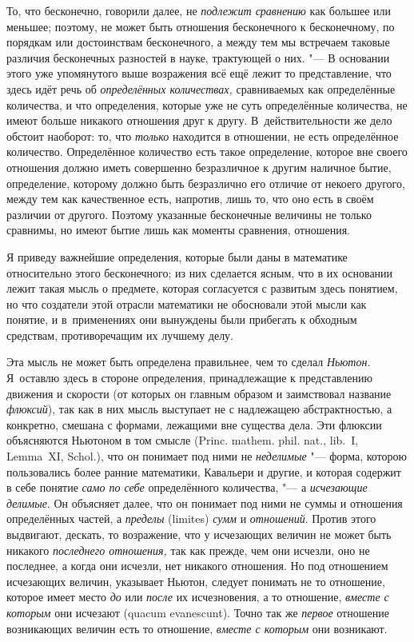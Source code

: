 То, что бесконечно, говорили далее, не {\em подлежит сравнению} как большее или
меньшее; поэтому, не может быть отношения бесконечного к бесконечному, по
порядкам или достоинствам бесконечного, а между тем мы встречаем таковые
различия бесконечных разностей в науке, трактующей о них. "--- В основании
этого уже упомянутого выше возражения всё ещё лежит то представление, что здесь
идёт речь об {\em определённых количествах,} сравниваемых как определённые
количества, и что определения, которые уже не суть определённые количества, не
имеют больше никакого отношения друг к другу. В~действительности же дело
обстоит наоборот: то, что {\em только} находится в отношении, не есть
определённое количество. Определённое количество есть такое определение,
которое вне своего отношения должно иметь совершенно безразличное к другим
наличное бытие, определение, которому должно быть безразлично его отличие от
некоего другого, между тем как качественное есть, напротив, лишь то, что оно
есть в своём различии от другого. Поэтому указанные бесконечные величины не
только сравнимы, но имеют бытие лишь как моменты сравнения, отношения.

Я приведу важнейшие определения, которые были даны в математике относительно
этого бесконечного; из них сделается ясным, что в их основании лежит такая
мысль о предмете, которая согласуется с развитым здесь понятием, но что
создатели этой отрасли математики не обосновали этой мысли как понятие, и
в~применениях они вынуждены были прибегать к обходным средствам,
противоречащим их лучшему делу.

Эта мысль не может быть определена правильнее, чем то сделал {\em Ньютон}.
Я~оставлю здесь в стороне определения, принадлежащие к представлению движения и
скорости (от которых он главным образом и заимствовал название {\em флюксий}),
так как в них мысль выступает не с надлежащею абстрактностью, а конкретно,
смешана с формами, лежащими вне существа дела. Эти флюксии объясняются Ньютоном
в том смысле (Princ. mathem. phil. nat., lib.~I, Lemma~XI, Schol.), что он
понимает под ними не {\em неделимые} "--- форма, которою пользовались более
ранние математики, Кавальери и другие, и которая содержит в себе понятие
{\em само по себе} определённого количества, "--- а {\em исчезающие делимые}.
Он объясняет далее, что он понимает под ними не суммы и отношения определённых
частей, а {\em пределы} (limites) {\em сумм} и {\em отношений}. Против этого
выдвигают, дескать, то возражение, что у исчезающих величин не может быть
никакого {\em последнего отношения,} так как прежде, чем они исчезли, оно не
последнее, а когда они исчезли, нет никакого отношения. Но под отношением
исчезающих величин, указывает Ньютон, следует понимать не то отношение, которое
имеет место {\em до} или {\em после} их исчезновения, а то отношение,
{\em вместе с которым} они исчезают (quacum evanescunt). Точно так же
{\em первое} отношение возникающих величин есть то отношение,
{\em вместе с которым} они возникают.

